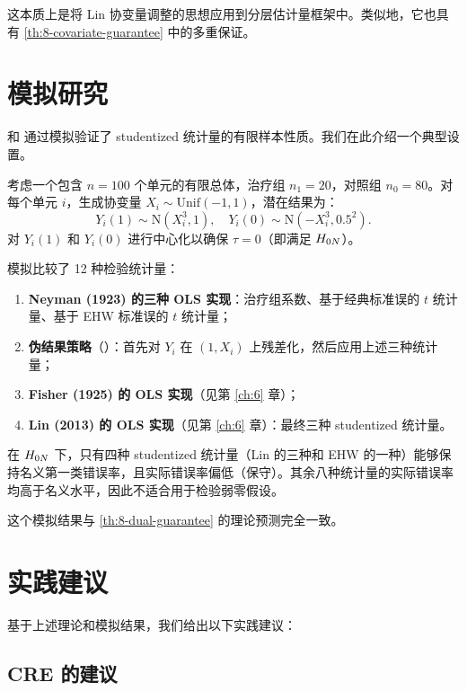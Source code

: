 这本质上是将 Lin 协变量调整的思想应用到分层估计量框架中。类似地，它也具有 \cref{th:8-covariate-guarantee} 中的多重保证。

\section{模拟研究}
\label{sec:8-simulation}

\citet{DingDasgupta:2017} 和 \citet{ZhaoDing:2021a} 通过模拟验证了 studentized 统计量的有限样本性质。我们在此介绍一个典型设置。

考虑一个包含 $n = 100$ 个单元的有限总体，治疗组 $n_1 = 20$，对照组 $n_0 = 80$。对每个单元 $i$，生成协变量 $X_i \sim \mathrm{Unif}(-1, 1)$，潜在结果为：
\[
Y_i(1) \sim \mathrm{N}(X_i^3, 1), \quad Y_i(0) \sim \mathrm{N}(-X_i^3, 0.5^2) .
\]
对 $Y_i(1)$ 和 $Y_i(0)$ 进行中心化以确保 $\tau = 0$（即满足 $H_{0N}$）。

模拟比较了 12 种检验统计量：
\begin{enumerate}
  \item \textbf{Neyman (1923) 的三种 OLS 实现}：治疗组系数、基于经典标准误的 $t$ 统计量、基于 EHW 标准误的 $t$ 统计量；
  \item \textbf{伪结果策略}（\citet{Rosenbaum:2002a}）：首先对 $Y_i$ 在 $(1, X_i)$ 上残差化，然后应用上述三种统计量；
  \item \textbf{Fisher (1925) 的 OLS 实现}（见第 \ref{ch:6} 章）；
  \item \textbf{Lin (2013) 的 OLS 实现}（见第 \ref{ch:6} 章）：最终三种 studentized 统计量。
\end{enumerate}

\begin{Result}
在 $H_{0N}$ 下，只有四种 studentized 统计量（Lin 的三种和 EHW 的一种）能够保持名义第一类错误率，且实际错误率偏低（保守）。其余八种统计量的实际错误率均高于名义水平，因此不适合用于检验弱零假设。
\end{Result}

这个模拟结果与 \cref{th:8-dual-guarantee} 的理论预测完全一致。

\section{实践建议}
\label{sec:8-recommendations}

基于上述理论和模拟结果，我们给出以下实践建议：

\subsection{CRE 的建议}
\label{sec:8-cre-recommendations}

